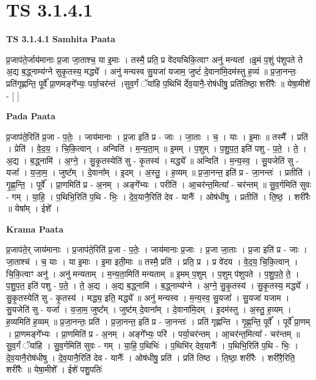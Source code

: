 \documentclass[17pt]{extarticle}
\begin{document}
\section{ TS 3.1.4.1 }

\textbf{TS 3.1.4.1 } \newline
\textbf{Samhita Paata} \newline

प्र॒जाप॑ते॒र्जाय॑मानाः प्र॒जा जा॒ताश्च॒ या इ॒माः । तस्मै॒ प्रति॒ प्र वे॑दयचिकि॒त्वाꣳ अनु॑ मन्यतां ॥इ॒मं प॒शुं प॑शुपते ते अ॒द्य ब॒द्ध्नाम्य॑ग्ने सुकृ॒तस्य॒ मद्ध्ये᳚ । अनु॑ मन्यस्व सु॒यजा॑ यजाम॒ जुष्टं॑ दे॒वाना॑मि॒दम॑स्तु ह॒व्यं ॥ प्र॒जा॒नन्तः॒ प्रति॑गृह्णन्ति॒ पूर्वे᳚ प्रा॒णमङ्गे᳚भ्यः॒ पर्या॒चर॑न्तं ।सुव॒र्गं ॅया॑हि प॒थिभि॑ र्देव॒यानै॒-रोष॑धीषु॒ प्रति॑तिष्ठा॒ शरी॑रैः ॥ येषा॒मीशे॑ - [  ] \newline

\textbf{Pada Paata} \newline

प्र॒जाप॑ते॒रिति॑ प्र॒जा - प॒तेः॒ । जाय॑मानाः । प्र॒जा इति॑ प्र - जाः । जा॒ताः । च॒ । याः । इ॒माः ॥ तस्मै᳚ । प्रति॑ । प्रेति॑ । वे॒द॒य॒ । चि॒कि॒त्वान् । अन्विति॑ । म॒न्य॒ता॒म् ॥ इ॒मम् । प॒शुम् । प॒शु॒प॒त॒ इति॑ पशु - प॒ते॒ । ते॒ । अ॒द्य । ब॒द्ध्नामि॑ । अ॒ग्ने॒ । सु॒कृ॒तस्येति॑ सु - कृ॒तस्य॑ । मद्ध्ये᳚ ॥ अन्विति॑ । म॒न्य॒स्व॒ । सु॒यजेति॑ सु - यजा᳚ । य॒जा॒म॒ । जुष्ट᳚म् । दे॒वाना᳚म् । इ॒दम् । अ॒स्तु॒ । ह॒व्यम् ॥ प्र॒जा॒नन्त॒ इति॑ प्र - जा॒नन्तः॑ । प्रतीति॑ । गृ॒ह्ण॒न्ति॒ । पूर्वे᳚ । प्रा॒णमिति॑ प्र - अ॒नम् । अङ्गे᳚भ्यः । परीति॑ । आ॒चर॑न्त॒मित्या᳚ - चर॑न्तम् ॥ सु॒व॒र्गमिति॑ सुवः - गम् । या॒हि॒ । प॒थिभि॒रिति॑ प॒थि - भिः॒ । दे॒व॒यानै॒रिति॑ देव - यानैः᳚ । ओष॑धीषु । प्रतीति॑ । ति॒ष्ठ॒ । शरी॑रैः ॥ येषा᳚म् । ईशे᳚ ।  \newline


\textbf{Krama Paata} \newline

प्र॒जाप॑ते॒र् जाय॑मानाः । प्र॒जाप॑ते॒रिति॑ प्र॒जा - प॒तेः॒ । जाय॑मानाः प्र॒जाः । प्र॒जा जा॒ताः । प्र॒जा इति॑ प्र - जाः । जा॒ताश्च॑ । च॒ याः । या इ॒माः । इ॒मा इती॒माः ॥ तस्मै॒ प्रति॑ । प्रति॒ प्र । प्र वे॑दय । वे॒द॒य॒ चि॒कि॒त्वान् । चि॒कि॒त्वाꣳ अनु॑ । अनु॑ मन्यताम् । म॒न्य॒ता॒मिति॑ मन्यताम् ॥ इ॒मम् प॒शुम् । प॒शुम् प॑शुपते । प॒शु॒प॒ते॒ ते॒ । प॒शु॒प॒त॒ इति॑ पशु - प॒ते॒ । ते॒ अ॒द्य । अ॒द्य ब॒द्ध्नामि॑ । ब॒द्ध्नाम्य॑ग्ने । अ॒ग्ने॒ सु॒कृ॒तस्य॑ । सु॒कृ॒तस्य॒ मद्ध्ये᳚ । सु॒कृ॒तस्येति॑ सु - कृ॒तस्य॑ । मद्ध्य॒ इति॒ मद्ध्ये᳚ ॥ अनु॑ मन्यस्व । म॒न्य॒स्व॒ सु॒यजा᳚ । सु॒यजा॑ यजाम । सु॒यजेति॑ सु - यजा᳚ । य॒जा॒म॒ जुष्ट᳚म् । जुष्ट॑म् दे॒वाना᳚म् । दे॒वाना॑मि॒दम् । इ॒दम॑स्तु । अ॒स्तु॒ ह॒व्यम् । ह॒व्यमिति॑ ह॒व्यम् ॥ प्र॒जा॒नन्तः॒ प्रति॑ । प्र॒जा॒नन्त॒ इति॑ प्र - जा॒नन्तः॑ । प्रति॑ गृह्णन्ति । गृ॒ह्ण॒न्ति॒ पूर्वे᳚ । पूर्वे᳚ प्रा॒णम् । प्रा॒णमङ्गे᳚भ्यः । प्रा॒णमिति॑ प्र - अ॒नम् । अङ्गे᳚भ्यः॒ परि॑ । पर्या॒चर॑न्तम् । आ॒चर॑न्त॒मित्या᳚ - चर॑न्तम् ॥ सु॒व॒र्गं ॅया॑हि । सु॒व॒र्गमिति॑ सुवः - गम् । या॒हि॒ प॒थिभिः॑ । प॒थिभि॑र् देव॒यानैः᳚ । प॒थिभि॒रिति॑ प॒थि - भिः॒ । दे॒व॒यानै॒रोष॑धीषु । दे॒व॒यानै॒रिति॑ देव - यानैः᳚ । ओष॑धीषु॒ प्रति॑ । प्रति॑ तिष्ठ । ति॒ष्ठा॒ शरी॑रैः । शरी॑रै॒रिति॒ शरी॑रैः ॥ येषा॒मीशे᳚ । ईशे॑ पशु॒पतिः॑ \newline
\end{document}
